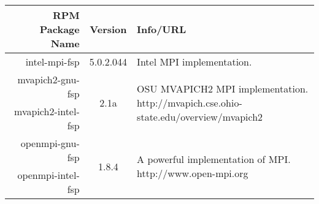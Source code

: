\small
\begin{tabularx}{\textwidth}{r|c|X}
\toprule
{\bf RPM Package Name} & {\bf Version} & {\bf Info/URL}  \\ 
\midrule

\multirow{2}{*}{intel-mpi-fsp} & 
\multirow{2}{*}{5.0.2.044} & 
\multirow{2}{*}{Intel MPI implementation.} \\
& & 
\\ \hline 

mvapich2-gnu-fsp & 
\multirow{2}{*}{2.1a} & 
\multirow{2}{\linewidth}{OSU MVAPICH2 MPI implementation. \newline {\color{blue} http://mvapich.cse.ohio-state.edu/overview/mvapich2}} \\ 
mvapich2-intel-fsp & 
& \\ 
\hline

openmpi-gnu-fsp & 
\multirow{2}{*}{1.8.4} & 
\multirow{2}{\linewidth}{A powerful implementation of MPI. \newline {\color{blue} http://www.open-mpi.org}} \\ 
openmpi-intel-fsp & 
& \\ 
\hline

\bottomrule
\end{tabularx}
